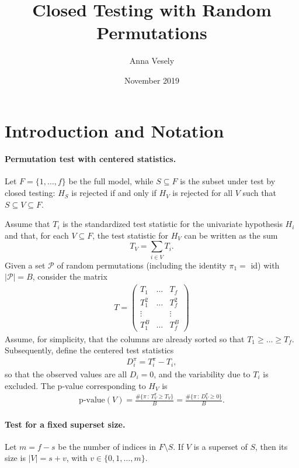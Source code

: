 \documentclass[11pt,a4paper,openright,twoside]{article}
\title{Closed Testing with Random Permutations}
\author{Anna Vesely}
\date{November 2019}
\begin{document}
\maketitle





\section{Introduction and Notation}
\paragraph{Permutation test with centered statistics.}
Let $F=\{1,\ldots, f\}$ be the full model, while $S\subseteq F$ is the subset under test by closed testing: $H_S$ is rejected if and only if $H_V$ is rejected for all $V$ such that $S\subseteq V\subseteq F$.

Assume that $T_i$ is the standardized test statistic for the univariate hypothesis $H_i$ and that, for each $V\subseteq F$, the test statistic for $H_V$ can be written as the sum
\[T_V=\sum_{i\in V}T_i.\]
Given a set $\mathcal{P}$ of random permutations (including the identity $\pi_1=$ id) with $|\mathcal{P}|=B$, consider the matrix
\begin{align*}
T=
\begin{pmatrix}
T_1 & \ldots & T_f\\
T_1^2 & \ldots & T_f^2\\
\vdots &  & \vdots\\
T_1^B & \ldots & T_f^B
\end{pmatrix}
\end{align*}
Assume, for simplicity, that the columns are already sorted so that $T_1\geq\ldots\geq T_f$. Subsequently, define the centered test statistics
\begin{align*}
D_i^{\pi}=T_i^{\pi}-T_i,
\end{align*}
so that the observed values are all $D_i=0$, and the variability due to $T_i$ is excluded. The p-value corresponding to $H_V$ is
\begin{align*}
\text{p-value}(V)=\frac{\#\{\pi\,:\,T_V^{\pi}\geq T_V\}}{B}=\frac{\#\{\pi\,:\,D_V^{\pi}\geq 0\}}{B}.
\end{align*}


\vspace{3mm}
\paragraph{Test for a fixed superset size.} Let $m=f-s$ be the number of indices in $F\setminus S$. If $V$ is a superset of $S$, then its size is $|V|=s+v$, with $v\in\{0,1,\ldots,m\}$.
\end{document}
